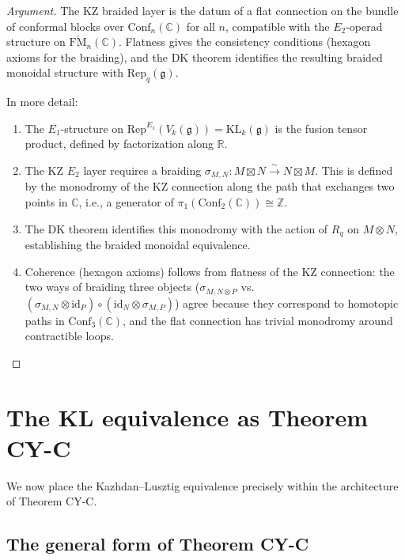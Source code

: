 \documentclass[11pt]{article}
\theoremstyle{definition}
\theoremstyle{remark}
\newcommand{\Rep}{\mathrm{Rep}}
\newcommand{\FM}{\overline{\mathrm{FM}}}
\newcommand{\id}{\mathrm{id}}
\newcommand{\frakg}{\mathfrak{g}}
\newcommand{\KL}{\mathrm{KL}}
\begin{document}
\begin{proof}[Argument]
The KZ braided layer is the datum of a flat connection on the bundle of
conformal blocks over $\mathrm{Conf}_n(\mathbb{C})$ for all $n$,
compatible with the $E_2$-operad structure on $\FM_n(\mathbb{C})$.
Flatness gives the consistency conditions (hexagon axioms for the
braiding), and the DK theorem identifies the resulting braided
monoidal structure with
$\Rep_q(\frakg)$.

In more detail:
\begin{enumerate}[label=(\arabic*)]
 \item The $E_1$-structure on $\Rep^{E_1}(V_k(\frakg)) = \KL_k(\frakg)$
 is the fusion tensor product, defined by factorization along $\mathbb{R}$.
 \item The KZ $E_2$ layer requires a braiding
 $\sigma_{M,N} \colon M \boxtimes N \xrightarrow{\sim} N \boxtimes M$.
 This is defined by the monodromy of the KZ connection along the
 path that exchanges two points in $\mathbb{C}$, i.e., a generator
 of $\pi_1(\mathrm{Conf}_2(\mathbb{C})) \cong \mathbb{Z}$.
 \item The DK theorem identifies this monodromy with the action of
 $R_q$ on $M \otimes N$, establishing the braided monoidal equivalence.
 \item Coherence (hexagon axioms) follows from flatness of the KZ
 connection: the two ways of braiding three objects
 ($\sigma_{M, N \otimes P}$ vs.\ $(\sigma_{M,N} \otimes \id_P) \circ
 (\id_N \otimes \sigma_{M,P})$) agree because they correspond to
 homotopic paths in $\mathrm{Conf}_3(\mathbb{C})$, and the flat
 connection has trivial monodromy around contractible loops.
\end{enumerate}
\end{proof}

\section{The KL equivalence as Theorem CY-C}
\label{sec:kl-as-cy-c}

We now place the Kazhdan--Lusztig equivalence precisely within the
architecture of Theorem CY-C.

\subsection{The general form of Theorem CY-C}
\label{subsec:cy-c-general}
\end{document}
